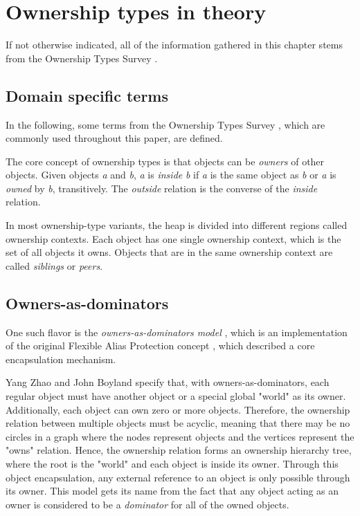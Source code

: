 \documentclass[sigplan,11pt,nonacm]{acmart}
\begin{document}

\section{Ownership types in theory}
\label{sec:theory}

If not otherwise indicated, all of the information gathered in this chapter stems from the Ownership Types Survey \cite{ownership-types-survey}.


\subsection{Domain specific terms}
\label{sec:domain-specific-terms}

In the following, some terms from the Ownership Types Survey \cite{ownership-types-survey}, which are commonly used throughout this paper, are defined.

The core concept of ownership types is that objects can be \emph{owners} of other objects.
Given objects \emph{a} and \emph{b}, \emph{a} is \emph{inside} \emph{b} if \emph{a} is the same object as \emph{b} or \emph{a} is \emph{owned} by \emph{b}, transitively.
The \emph{outside} relation is the converse of the \emph{inside} relation.

In most ownership-type variants, the heap is divided into different regions called ownership contexts.
Each object has one single ownership context, which is the set of all objects it owns.
Objects that are in the same ownership context are called \emph{siblings} or \emph{peers}.


\subsection{Owners-as-dominators}
\label{sec:owners-as-dominators}

One such flavor is the \emph{owners-as-dominators model} \cite{ownership-types-survey}, which is an implementation of the original Flexible Alias Protection concept \cite{flexible-alias-protection}, which described a core encapsulation mechanism.

Yang Zhao and John Boyland \cite{permission-ownership-types} specify that, with owners-as-dominators, each regular object must have another object or a special global "world" as its owner.
Additionally, each object can own zero or more objects.
Therefore, the ownership relation between multiple objects must be acyclic, meaning that there may be no circles in a graph where the nodes represent objects and the vertices represent the "owns" relation.
Hence, the ownership relation forms an ownership hierarchy tree, where the root is the "world" and each object is inside its owner.
Through this object encapsulation, any external reference to an object is only possible through its owner.
This model gets its name from the fact that any object acting as an owner is considered to be a \emph{dominator} for all of the owned objects.
\end{document}
